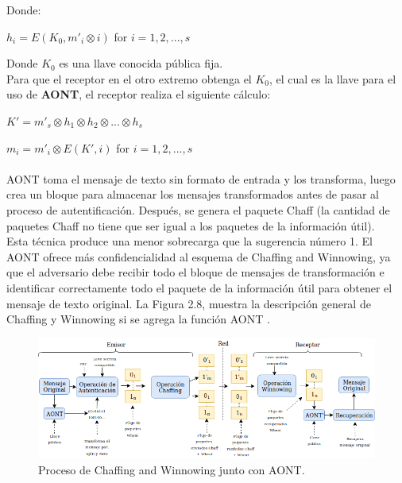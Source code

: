 \documentclass[12pt, a4paper, titlepage]{report}
\begin{document}
        Donde:
        \begin{center}
            $h_i=E(K_0,m'_i \otimes i)$ for $i=1,2,...,s$
        \end{center}
        
        Donde $K_0$ es una llave conocida pública fija.\\
        Para que el receptor en el otro extremo obtenga el $K_0$, el cual es la llave para el uso de \textbf{AONT}, el receptor realiza el siguiente cálculo:
        
        \begin{center}
            $K'=m'_s \otimes h_1 \otimes h_2 \otimes ... \otimes h_s$
        \end{center}
        \begin{center}
            $m_i=m'_i \otimes E(K',i)$ for $i=1,2,...,s$
        \end{center}
        
        \paragraph{}
        AONT toma el mensaje de texto sin formato de entrada y los transforma, luego crea un bloque para almacenar los mensajes transformados antes de pasar al proceso de autentificación. Después, se genera el paquete Chaff (la cantidad de paquetes Chaff no tiene que ser igual a los paquetes de la informaci\'on \'util).\\
        Esta técnica produce una menor sobrecarga que la sugerencia número 1. El AONT ofrece más confidencialidad al esquema de Chaffing and Winnowing, ya que el adversario debe recibir todo el bloque de mensajes de transformación e identificar correctamente todo el paquete de la informaci\'on \'util para obtener el mensaje de texto original. La Figura 2.8, muestra la
        descripción general de Chaffing y Winnowing si se agrega la función AONT \cite{refAONT}.
        
        \begin{figure}[H]
			\begin{center}	          \includegraphics[width=14cm]{./imagenes/MarcoTeorico/chaffVsCrypto.png}
				\caption{Proceso de Chaffing and Winnowing junto con AONT.}
			\end{center}
		\end{figure}
		\label{C&W_AONT}
		
\end{document}
